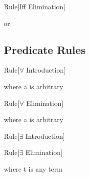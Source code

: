 \begin{namedthm}{Rule}[Iff Elimination]

\begin{bprooftree}
\end{bprooftree}\qquad or \qquad
\begin{bprooftree}
\end{bprooftree}

\end{namedthm}

\subsection{Predicate Rules}
\label{appendix:nd-pred}

\begin{namedthm}{Rule}[$\forall$ Introduction]

\begin{bprooftree}
\end{bprooftree}\qquad where a is arbitrary \qquad

\end{namedthm}

\begin{namedthm}{Rule}[$\forall$ Elimination]

\begin{bprooftree}
\end{bprooftree}\qquad where a is arbitrary \qquad

\end{namedthm}


\begin{namedthm}{Rule}[$\exists$ Introduction]

\begin{bprooftree}
\end{bprooftree}\qquad

\end{namedthm}

\begin{namedthm}{Rule}[$\exists$ Elimination]

\begin{bprooftree}
\end{bprooftree}\qquad where t is any term

\end{namedthm}

